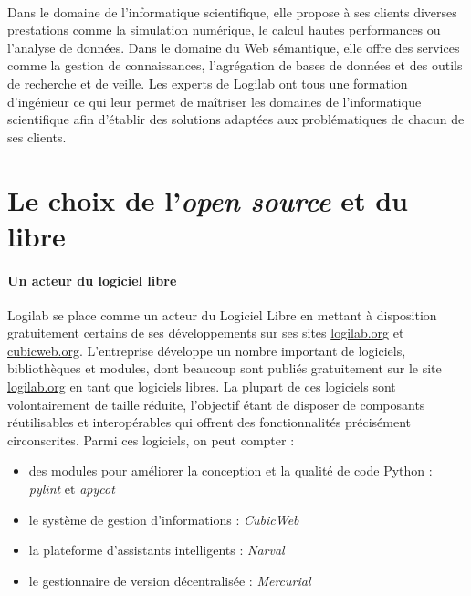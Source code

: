 \documentclass {report}
\begin{document}
\paragraph{}
Dans le domaine de l'informatique scientifique, elle propose à ses clients diverses prestations comme la simulation numérique, le calcul hautes performances ou l'analyse de données. Dans le domaine du Web sémantique, elle offre des services comme la gestion de connaissances, l'agrégation de bases de données et des outils de recherche et de veille. Les experts de Logilab ont tous une formation d'ingénieur ce qui leur permet de maîtriser les domaines de l'informatique scientifique afin d'établir des solutions adaptées aux problématiques de chacun de ses clients.




\section{Le choix de l'\textit{open source} et du libre}
\paragraph{Un acteur du logiciel libre}
Logilab se place comme un acteur du Logiciel Libre en mettant à disposition gratuitement certains de ses développements sur ses sites \url{logilab.org} et \url{cubicweb.org}. L'entreprise développe un nombre important de logiciels, bibliothèques et modules, dont beaucoup sont publiés gratuitement sur le site \url{logilab.org} en tant que logiciels libres. La plupart de ces logiciels sont volontairement de taille réduite, l’objectif étant de disposer de composants réutilisables et interopérables qui offrent des fonctionnalités précisément circonscrites. Parmi ces logiciels, on peut compter :
\begin{itemize}
\item des modules pour améliorer la conception et la qualité de code Python : \textit{pylint} et \textit{apycot} 
\item le système de gestion d’informations : \textit{CubicWeb} 
\item la plateforme d’assistants intelligents : \textit{Narval}
\item le gestionnaire de version décentralisée : \textit{Mercurial}
\end{itemize}
\end{document}
